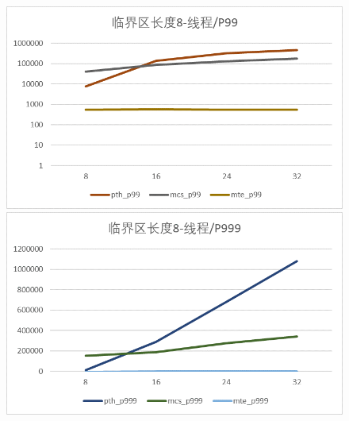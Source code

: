 \documentclass[UTF8]{ctexart}
\begin{document}
\begin{figure}[!h]
    \centering
    \begin{minipage}{0.49\linewidth}
        \centering
        \includegraphics[scale=0.64]{../images/11.png}
    \end{minipage}
    \begin{minipage}{0.49\linewidth}
        \centering
        \includegraphics[scale=0.64]{../images/12.png}
    \end{minipage}
\end{figure}
\end{document}
